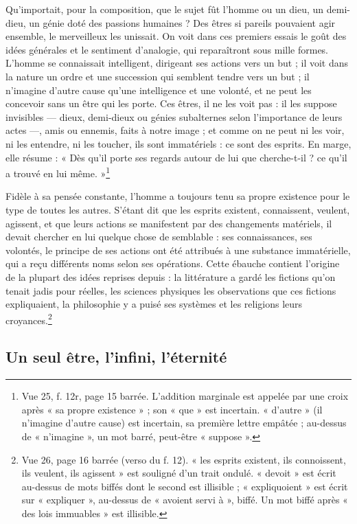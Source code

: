 \documentclass[11pt,a4paper]{article}
\begin{document}
Qu'importait, pour la composition, que le sujet fût l'homme ou un dieu, un
demi-dieu, un génie doté des passions humaines ? Des êtres si pareils
pouvaient agir ensemble, le merveilleux les unissait. On voit dans ces premiers
essais le goût des idées générales et le sentiment d'analogie, qui
reparaîtront sous mille formes. L'homme se connaissait intelligent, dirigeant
ses actions vers un but ; il voit dans la nature un ordre et une succession qui
semblent tendre vers un but ; il n'imagine d'autre cause qu'une intelligence et
une volonté, et ne peut les concevoir sans un être qui les porte. Ces êtres,
il ne les voit pas : il les suppose invisibles — dieux, demi-dieux ou génies
subalternes selon l'importance de leurs actes —, amis ou ennemis, faits à notre
image ; et comme on ne peut ni les voir, ni les entendre, ni les toucher, ils
sont immatériels : ce sont des esprits. En marge, elle résume : « Dès qu'il
porte ses regards autour de lui que cherche-t-il ? ce qu'il a trouvé en lui
même. »\footnote{Vue 25, f. 12r, page 15 barrée. L'addition marginale est
appelée par une croix après « sa propre existence » ; son « que » est
incertain. « d'autre » (il n'imagine d'autre cause) est incertain, sa première
lettre empâtée ; au-dessus de « n'imagine », un mot barré, peut-être
« suppose ».}

Fidèle à sa pensée constante, l'homme a toujours tenu sa propre existence pour
le type de toutes les autres. S'étant dit que les esprits existent, connaissent,
veulent, agissent, et que leurs actions se manifestent par des changements
matériels, il devait chercher en lui quelque chose de semblable : ses
connaissances, ses volontés, le principe de ses actions ont été attribués à une
substance immatérielle, qui a reçu différents noms selon ses opérations. Cette
ébauche contient l'origine de la plupart des idées reprises depuis : la
littérature a gardé les fictions qu'on tenait jadis pour réelles, les sciences
physiques les observations que ces fictions expliquaient, la philosophie y a
puisé ses systèmes et les religions leurs croyances.\footnote{Vue 26, page 16
barrée (verso du f. 12). « les esprits existent, ils connoissent, ils veulent,
ils agissent » est souligné d'un trait ondulé. « devoit » est écrit au-dessus de
mots biffés dont le second est illisible ; « expliquoient » est écrit sur
« expliquer », au-dessus de « avoient servi à », biffé. Un mot biffé après « des
lois immuables » est illisible.}

\subsection*{Un seul être, l'infini, l'éternité}
\end{document}
